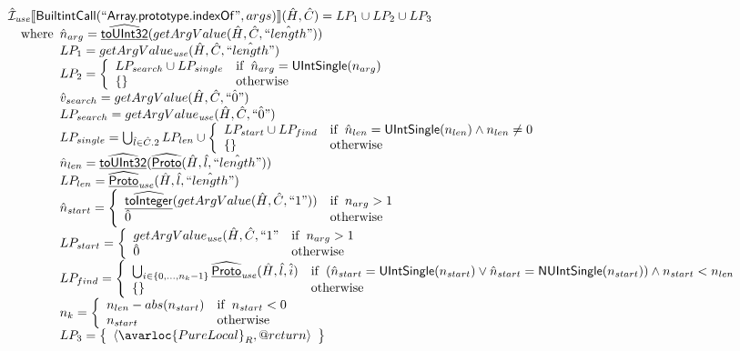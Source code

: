 \[\begin{array}{l}
\aI_{\it use}\lbr \SF{BuiltintCall}(``\SF{Array.prototype.indexOf}",args)\rbr(\hat{H},\hat{C}) = LP_1 \cup LP_2 \cup LP_3\\
\quad\wherec{
  \hat{n}_{arg} = \ahf{toUInt32}(getArgValue(\hat{H}, \hat{C}, \hat{``length"}))\\
  LP_1 = getArgValue_{\it use}(\hat{H}, \hat{C}, \hat{``length"})\\
  LP_2 = \left\{\begin{array}{ll}
      LP_{search} \cup LP_{single} & \ifc{\hat{n}_{arg} = \SF{UIntSingle}(n_{arg})}\\
      \set{} & \owc
    \end{array}\right.\\
  \hat{v}_{search} = getArgValue(\hat{H}, \hat{C}, \hat{``0"})\\
  LP_{search} = getArgValue_{\it use}(\hat{H}, \hat{C}, \hat{``0"})\\
  LP_{single} = \bigcup_{\hat{l} \in \hat{C}.2}  LP_{len} \cup \left\{\begin{array}{ll}
      LP_{start} \cup LP_{find}
      & \ifc{\hat{n}_{len} = \SF{UIntSingle}(n_{len}) \land n_{len} \neq 0}\\
     \set{} & \owc
    \end{array}\right.\\
  \hat{n}_{len} = \ahf{toUInt32}(\ahf{Proto}(\hat{H}, \hat{l}, \hat{``length"}))\\
  LP_{len} =  \ahf{Proto}_{\it use}(\hat{H}, \hat{l}, \hat{``length"})\\
  \hat{n}_{start} = \left\{\begin{array}{ll}
      \ahf{toInteger}(getArgValue(\hat{H}, \hat{C}, ``1")) & \ifc{n_{arg} > 1}\\
      \hat{0} & \owc
    \end{array}\right.\\
  LP_{start} = \left\{\begin{array}{ll}
      getArgValue_{\it use}(\hat{H}, \hat{C}, ``1" & \ifc{n_{arg} > 1}\\
      \hat{0} & \owc
    \end{array}\right.\\
  LP_{find} = \left\{\begin{array}{ll}
      \bigcup_{i \in \{0,...,n_k-1\}} \ahf{Proto}_{\it use}(\hat{H}, \hat{l}, \hat{i})
      & \ifc{(\hat{n}_{start} = \SF{UIntSingle}(n_{start}) \lor \hat{n}_{start} = \SF{NUIntSingle}(n_{start})) \land n_{start} < n_{len}}\\
      \set{} & \owc
    \end{array}\right.\\
  n_k = \left\{\begin{array}{ll}
      n_{len} - abs(n_{start}) & \ifc{n_{start} < 0}\\
      n_{start} & \owc
    \end{array}\right.\\
  LP_3 = \set{\langle\avarloc{PureLocal}_R,\varprop{return}\rangle}\\
  }\\
\\

\end{array}
\]
